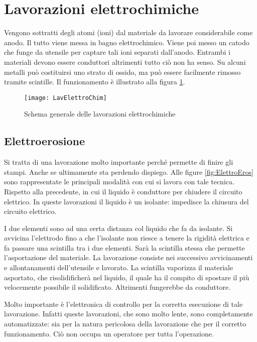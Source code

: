 \section{Lavorazioni elettrochimiche}
Vengono sottratti degli atomi (ioni) dal materiale da lavorare considerabile come anodo. Il tutto viene messa in bagno elettrochimico. Viene poi messo un catodo che funge da utensile per captare tali ioni separati dall'anodo.
Entrambi i materiali devono essere conduttori altrimenti tutto ciò non ha senso.
Su alcuni metalli può costituirsi uno strato di ossido, ma può essere facilmente rimosso tramite scintille.
Il funzionamento è illustrato alla figura \ref{fig:LavElettroChim}.

\begin{figure}
\centering
\texttt{[image: LavElettroChim]}
\caption{Schema generale delle lavorazioni elettrochimiche}
\label{fig:LavElettroChim}
\end{figure}

\subsection{Elettroerosione}
Si tratta di una lavorazione molto importante perché permette di finire gli stampi. Anche se ultimamente sta perdendo dispiego.
Alle figure \ref{fig:ElettroEros} sono rappresentate le principali modalità con cui si lavora con tale tecnica.
Rispetto alla precedente, in cui il liquido è conduttore per chiudere il circuito elettrico. In queste lavorazioni il liquido è un isolante: impedisce la chiusura del circuito elettrico.

I due elementi sono ad una certa distanza col liquido che fa da isolante. Si avvicina l'elettrodo fino a che l'isolante non riesce a tenere la rigidità elettrica e fa passare una scintilla tra i due elementi.
Sarà la scintilla stessa che permette l'asportazione del materiale.
La lavorazione consiste nei successivo avvicinamenti e allontanamenti dell'utensile e lavorato.
La scintilla vaporizza il materiale asportato, che risolidificherà nel liquido, il quale ha il compito di spostare il più velocemente possibile il solidificato. Altrimenti fungerebbe da conduttore.

Molto importante è l'elettronica di controllo per la corretta esecuzione di tale lavorazione. Infatti queste lavorazioni, che sono molto lente, sono completamente automatizzate: sia per la natura pericolosa della lavorazione che per il corretto funzionamento. Ciò non occupa un operatore per tutta l'operazione.

